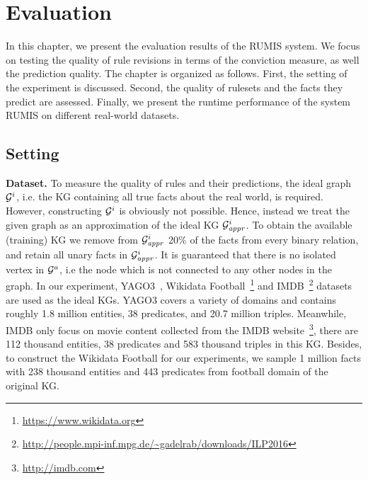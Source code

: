 \chapter{Evaluation}
\label{chap:eval}

In this chapter, we present the evaluation results of the RUMIS system. We focus on testing the quality of rule revisions in terms of the conviction measure, as well the prediction quality. The chapter is organized as follows. First, the setting of the experiment is discussed. Second, the quality of rulesets and the facts they predict are assessed. Finally, we present the runtime performance of the system RUMIS on different real-world datasets.

\section{Setting}

\textbf{Dataset.} To measure the quality of rules and their predictions, the ideal graph $\mathcal{G}^i$, i.e. the KG containing all true facts about the real world, is required. However, constructing $\mathcal{G}^i$ is obviously not possible. Hence, instead we treat the given graph as an approximation of the ideal KG $\mathcal{G}^i_{\mathit{appr}}$. To obtain the available (training) KG we remove from $\mathcal{G}^i_{\mathit{appr}}$ 20\% of the facts from every binary relation, and retain all unary facts in $\mathcal{G}^i_{\mathit{appr}}$. It is guaranteed that there is no isolated vertex in $\mathcal{G}^a$, i.e the node which is not connected to any other nodes in the graph. In our experiment, YAGO3~\cite{ref28}, Wikidata Football~\footnote{\url{https://www.wikidata.org}} and IMDB~\footnote{\url{http://people.mpi-inf.mpg.de/~gadelrab/downloads/ILP2016}} datasets are used as the ideal KGs. YAGO3 covers a variety of domains and contains roughly 1.8 million entities, 38 predicates, and 20.7 million triples. Meanwhile, IMDB only focus on movie content collected from the IMDB website~\footnote{\url{http://imdb.com}}, there are 112 thousand entities, 38 predicates and 583 thousand triples in this KG. Besides, to construct the Wikidata Football for our experiments, we sample 1 million facts with 238 thousand entities and 443 predicates from football domain of the original KG. %

